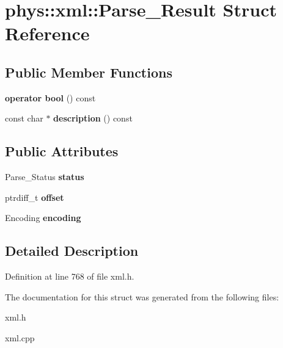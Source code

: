 \hypertarget{structphys_1_1xml_1_1Parse__Result}{
\section{phys::xml::Parse\_\-Result Struct Reference}
\label{d2/d63/structphys_1_1xml_1_1Parse__Result}
}
\subsection*{Public Member Functions}
\begin{DoxyCompactItemize}
\item 
\hypertarget{structphys_1_1xml_1_1Parse__Result_a30936fabebc4ea1c162e8f88f4b4b860}{
{\bfseries operator bool} () const }
\label{d2/d63/structphys_1_1xml_1_1Parse__Result_a30936fabebc4ea1c162e8f88f4b4b860}

\item 
\hypertarget{structphys_1_1xml_1_1Parse__Result_a33e3471c2eacf7ef7bc3b468989fb783}{
const char $\ast$ {\bfseries description} () const }
\label{d2/d63/structphys_1_1xml_1_1Parse__Result_a33e3471c2eacf7ef7bc3b468989fb783}

\end{DoxyCompactItemize}
\subsection*{Public Attributes}
\begin{DoxyCompactItemize}
\item 
\hypertarget{structphys_1_1xml_1_1Parse__Result_a36c04db1a436df0d31b7dab90a59e87b}{
Parse\_\-Status {\bfseries status}}
\label{d2/d63/structphys_1_1xml_1_1Parse__Result_a36c04db1a436df0d31b7dab90a59e87b}

\item 
\hypertarget{structphys_1_1xml_1_1Parse__Result_aa136f269131f072b38612f5a82706238}{
ptrdiff\_\-t {\bfseries offset}}
\label{d2/d63/structphys_1_1xml_1_1Parse__Result_aa136f269131f072b38612f5a82706238}

\item 
\hypertarget{structphys_1_1xml_1_1Parse__Result_ad868493ee57f61e89b6945654a55394a}{
Encoding {\bfseries encoding}}
\label{d2/d63/structphys_1_1xml_1_1Parse__Result_ad868493ee57f61e89b6945654a55394a}

\end{DoxyCompactItemize}


\subsection{Detailed Description}


Definition at line 768 of file xml.h.



The documentation for this struct was generated from the following files:\begin{DoxyCompactItemize}
\item 
xml.h\item 
xml.cpp\end{DoxyCompactItemize}
